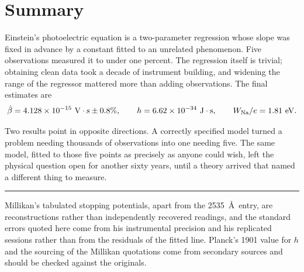 \documentclass[11pt]{article}
\begin{document}
\section{Summary}

Einstein's photoelectric equation is a two-parameter regression whose slope
was fixed in advance by a constant fitted to an unrelated phenomenon.  Five
observations measured it to under one percent.  The regression itself is
trivial; obtaining clean data took a decade of instrument building, and
widening the range of the regressor mattered more than adding observations.
The final estimates are
\[
  \hat\beta = 4.128\times10^{-15}~\text{V}\cdot\text{s} \pm 0.8\%,
  \qquad
  h = 6.62\times10^{-34}~\text{J}\cdot\text{s},
  \qquad
  W_{\rm Na}/e = 1.81~\text{eV}.
\]

Two results point in opposite directions.  A correctly specified model turned
a problem needing thousands of observations into one needing five.  The same
model, fitted to those five points as precisely as anyone could wish, left the
physical question open for another sixty years, until a theory arrived that
named a different thing to measure.

\bigskip
\begin{center}\rule{0.4\textwidth}{0.4pt}\end{center}
\smallskip
\noindent\footnotesize
Millikan's tabulated stopping potentials, apart from the 2535~\AA\ entry, are
reconstructions rather than independently recovered readings, and the standard
errors quoted here come from his instrumental precision and his replicated
sessions rather than from the residuals of the fitted line.  Planck's 1901
value for $h$ and the sourcing of the Millikan quotations come from secondary
sources and should be checked against the originals.

\bigskip


\end{document}
